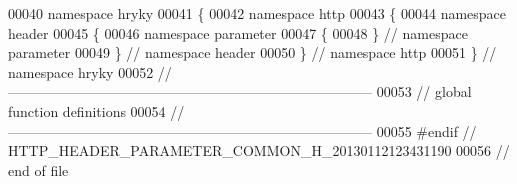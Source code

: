 \begin{DoxyCode}
00040 \textcolor{keyword}{namespace }hryky
00041 \{
00042 \textcolor{keyword}{namespace }http
00043 \{
00044 \textcolor{keyword}{namespace }header
00045 \{
00046 \textcolor{keyword}{namespace }parameter
00047 \{
00048 \} \textcolor{comment}{// namespace parameter}
00049 \} \textcolor{comment}{// namespace header}
00050 \} \textcolor{comment}{// namespace http}
00051 \} \textcolor{comment}{// namespace hryky}
00052 \textcolor{comment}{//
      ------------------------------------------------------------------------------}
00053 \textcolor{comment}{// global function definitions}
00054 \textcolor{comment}{//
      ------------------------------------------------------------------------------}
00055 \textcolor{preprocessor}{#endif // HTTP\_HEADER\_PARAMETER\_COMMON\_H\_20130112123431190}
00056 \textcolor{preprocessor}{}\textcolor{comment}{// end of file}
\end{DoxyCode}
